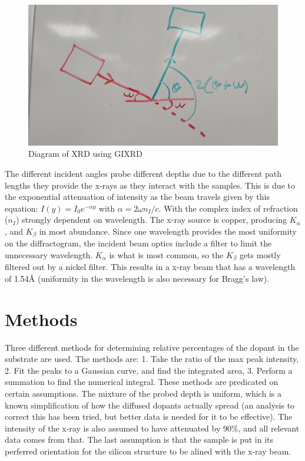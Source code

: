 \documentclass{article}
\begin{document}
\begin{multicols}{2}
\begin{figure}[H]
    \centering
    \includegraphics[width=\linewidth]{2theta scan diagram.jpg}
    \caption{Diagram of XRD using GIXRD}
    \label{fig:GIXRD diagram}
\end{figure}

    The different incident angles probe different depths due to the different 
    path lengths they provide the x-rays as they interact with the samples. This 
    is due to the exponential attenuation of intensity as the beam travels given 
    by this equation: $I(y)=I_0e^{-\alpha y}$ with $\alpha=2\omega n_I/c$. With 
    the complex index of refraction ($n_I$) strongly dependent on wavelength. 
    The x-ray source is copper, producing $K_\alpha$, and $K_\beta$ in most 
    abundance. Since one wavelength provides the most uniformity on the diffractogram, 
    the incident beam optics include a filter to limit the unnecessary wavelength. 
    $K_\alpha$ is what is most common, so the $K_\beta$ gets mostly filtered out by a
     nickel filter. This results in a x-ray beam that has a wavelength of 1.54\AA
      \space (uniformity in the wavelength is also necessary for Bragg's law).
    
\section{Methods}

    Three different methods for determining relative percentages of the dopant
     in the substrate are used. The methods are: 1. Take the ratio of the max 
     peak intensity, 2. Fit the peaks to a Gaussian curve, and find the integrated 
     area, 3. Perform a summation to find the numerical integral. These methods 
     are predicated on certain assumptions. The mixture of the probed depth is 
     uniform, which is a known simplification of how the diffused dopants actually 
     spread (an analysis to correct this has been tried, but better data is needed 
     for it to be effective). The intensity of the x-ray is also assumed to have 
     attenuated by 90\%, and all relevant data comes from that. The last assumption 
     is that the sample is put in its perferred orientation for the silicon structure 
     to be alined with the x-ray beam.
    

\end{multicols}
\end{document}
